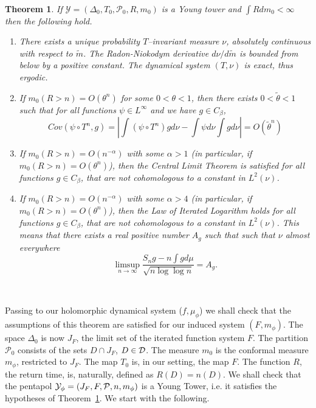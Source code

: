 \documentclass[12pt]{amsart}
\numberwithin{equation}{section}
\newcommand{\nl}{\newline}
\newtheorem{thm}{Theorem}[section]
\def\De{\Delta}               \def\e{\varepsilon}          \def\f{\phi}
\def\lt{\left}                \def\rt{\right}
\def\sp{\medskip}             \def\fr{\noindent}        \def\nl{\newline}
\begin{document}
\

\begin{thm}\label{lsyoung0}
If $\mathcal{Y}=(\De_0,T_0,\mathcal{P}_0,R,m_0)$ is a Young tower and
$\int R dm_0<\infty$ then the following hold.

\sp\begin{enumerate}
\item{} There exists a unique probability  
$T$--invariant measure $\nu$, absolutely continuous with respect to
$\tilde m$. The Radon-Niokodym derivative $d\nu/d\tilde m$ is bounded
from below by a positive constant. The dynamical system $(T,\nu)$ is
exact, thus ergodic. 
\sp\item{} If $m_0(R>n)=O(\theta^n)$ for some $0<\theta<1$, then there
exists $0<\tilde\theta<1$ such that for all functions $\psi\in
L^\infty$ and we have $ g\in C_\beta$,  
\begin{equation}\label{cov}
Cov(\psi\circ T^n, g)
=\lt|\int (\psi\circ T^n) g d\nu-\int\psi d\nu\int g d\nu\rt|
=O(\tilde\theta^n) 
\end{equation}
\item{} If $m_0(R>n)=O(n^{-\alpha})$ with some $\alpha>1$ (in
  particular, if $m_0(R>n)=O(\theta^n)$), then  the Central Limit
  Theorem is satisfied for all functions $ g\in C_\beta$, that
  are not cohomologous to a constant in $L^2(\nu)$. 

\sp\item{} If $m_0(R>n)=O(n^{-\alpha})$ with some $\alpha>4$ (in
  particular, if $m_0(R>n)=O(\theta^n)$), then the Law of
  Iterated Logarithm holds for all functions $ g\in C_\beta$, that
  are not cohomologous to a constant in $L^2(\nu)$. This means that
  there exists a real positive number $A_g$  such that such that
  $\nu$ almost everywhere  
$$
\limsup_{n\to\infty}\frac{S_{n}g-n\int gd\mu}{\sqrt{n\log\log n}}=A_g. 
$$
\end{enumerate}
\end{thm}

\

\fr Passing to our holomorphic dynamical system ($f,\mu_\phi$) we
shall check that the assumptions of this  theorem are 
satisfied for our induced system $(F,m_\phi)$.    
The space $\Delta_0$ is now $J_F$, the limit set of the iterated
function system $F$. The partition $\mathcal{P}_0$ consists of the
sets $D\cap J_F$, $D\in\mathcal D$. The measure $m_0$ is the
conformal measure $m_\phi$, restricted to $J_F$.  
The map $T_0$ is, in our setting, the map $F$. The function $R$, the
return time, is, naturally, defined as $R(D)=n(D)$. We shall check
that the pentapol $\mathcal Y_\phi=(J_F,F,{\mathcal P},n,m_\phi)$ is a Young
Tower, i.e. it satisfies the hypotheses of Theorem~\ref{lsyoung0}. We
start with the following. 
\end{document}
